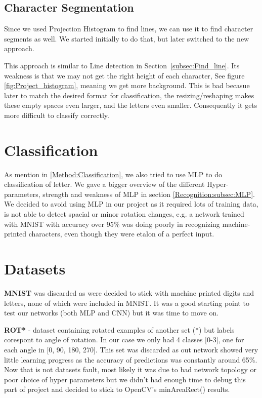 \documentclass[Report.tex]{subfiles}
\begin{document}
\begin{flushleft}
\end{flushleft}


\subsection{Character Segmentation}
\begin{flushleft}
Since we used Projection Histogram to find lines, we can use it to find character segments as well. We started initially to do that, but later switched to the new approach. \par
This approach is similar to Line detection in Section~\ref{subsec:Find_line}. Its weakness is that we may not get the right height of each character, See figure \ref{fig:Project_histogram}, meaning we get more background. This is bad becasue later to match the desired format for classification, the resizing/reshaping makes these empty spaces even larger, and the letters even smaller. Consequently it gets more difficult to classify correctly.
\end{flushleft}

\section{Classification}
\label{sec:Discarded Method:Classification}

\begin{flushleft}
  As mention in \ref{Method:Classification}, we also tried to use MLP to do classification of letter. We gave a bigger overview of the different Hyper-parameters, strength and weakness of MLP in section \ref{Recognition:subsec:MLP}. 
  We decided to avoid using MLP in our project as it required lots of training data, is not able to detect spacial or minor rotation changes, e.g. a network trained with MNIST with accuracy over 95\% was doing poorly in recognizing machine-printed characters, even though they were etalon of a perfect input.

\end{flushleft}

\section{Datasets}
\begin{flushleft}
\textbf{MNIST} was discarded as were decided to stick with machine printed digits and letters, none of which were included in MNIST. It was a good starting point to test our networks (both MLP and CNN) but it was time to move on.

\par
\textbf{ROT*} - dataset containing rotated examples of another set (*) but labels corespont to angle of rotation. In our case we only had 4 classes [0-3], one for each angle in [0, 90, 180, 270].
This set was discarded as out network showed very little learning progress as the accuracy of predictions was constantly around 65\%. Now that is not datasets fault, most likely it was due to bad network topology or poor choice of hyper parameters but we didn't had enough time to debug this part of project and decided to stick to OpenCV's minAreaRect() results.
\end{flushleft}
\end{document}
